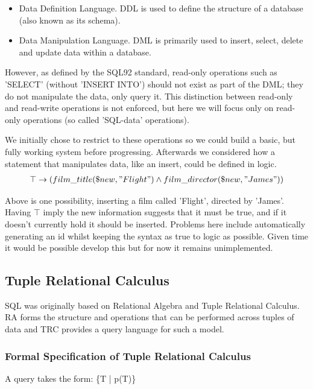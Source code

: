 \documentclass[a4paper, 11pt]{article}
\begin{document}
  \begin{itemize}
      \item
        Data Definition Language. DDL is used to define the structure of a
        database (also known as its schema).
      \item
        Data Manipulation Language. DML is primarily used to insert, select,
        delete and update data within a database.
  \end{itemize}

  However, as defined by the SQL92 standard\cite{isoSQL}, read-only operations
  such as 'SELECT' (without 'INSERT INTO') should not exist as part of the DML;
  they do not manipulate the data, only query it. This distinction between
  read-only and read-write operations is not enforced, but here we will focus
  only on read-only operations (so called 'SQL-data' operations).

  We initially chose to restrict to these operations so we could build a basic,
  but fully working system before progressing. Afterwards we considered how
  a statement that manipulates data, like an insert, could be defined in logic.
  \begin{gather}
    \top \rightarrow (film\_title(\$new, "Flight") \land film\_director(\$new, "James"))
  \end{gather}

  Above is one possibility, inserting a film called 'Flight', directed by 
  'James'. Having $\top$ imply the new information suggests that it must be 
  true, and if it doesn't currently hold it should be inserted. Problems here
  include automatically generating an id whilst keeping the syntax as true to
  logic as possible. Given time it would be possible develop this but for now
  it remains unimplemented.

\subsection{Tuple Relational Calculus}
  SQL was originally based on Relational Algebra and Tuple Relational
  Calculus. RA forms the structure and operations that can be performed
  across tuples of data and TRC provides a query language for such a model.

  \subsubsection{Formal Specification of Tuple Relational Calculus\cite{lecRA}}
    \label{sec:formalTRC}
    A query takes the form: \{T | p(T)\}
\end{document}
